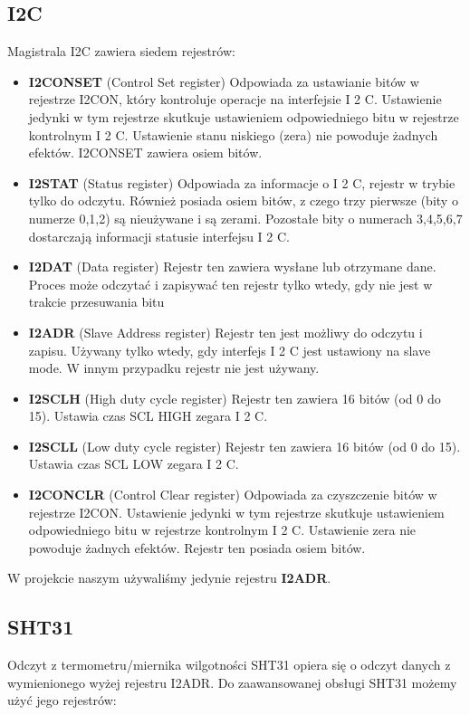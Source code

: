 \documentclass{classrep}
\begin{document}
\subsection {I2C}
Magistrala I2C zawiera siedem rejestrów:
\begin{itemize}
  \item \textbf{I2CONSET} (Control Set register) Odpowiada za ustawianie bitów w rejestrze I2CON, który
kontroluje operacje na interfejsie I 2 C. Ustawienie jedynki w tym rejestrze skutkuje
ustawieniem odpowiedniego bitu w rejestrze kontrolnym I 2 C. Ustawienie stanu niskiego
(zera) nie powoduje żadnych efektów. I2CONSET zawiera osiem bitów.
  \item \textbf{I2STAT} (Status register) Odpowiada za informacje o I 2 C, rejestr w trybie tylko do odczytu.
Również posiada osiem bitów, z czego trzy pierwsze (bity o numerze 0,1,2) są nieużywane i
są zerami. Pozostałe bity o numerach 3,4,5,6,7 dostarczają informacji statusie interfejsu I 2 C.
  \item \textbf{I2DAT} (Data register) Rejestr ten zawiera wysłane lub otrzymane dane. Proces może
odczytać i zapisywać ten rejestr tylko wtedy, gdy nie jest w trakcie przesuwania bitu
  \item \textbf{I2ADR} (Slave Address register) Rejestr ten jest możliwy do odczytu i zapisu. Używany tylko
wtedy, gdy interfejs I 2 C jest ustawiony na slave mode. W innym przypadku rejestr nie jest
używany.
  \item \textbf{I2SCLH} (High duty cycle register) Rejestr ten zawiera 16 bitów (od 0 do 15). Ustawia czas SCL
HIGH zegara I 2 C.
  \item \textbf{I2SCLL} (Low duty cycle register) Rejestr ten zawiera 16 bitów (od 0 do 15). Ustawia czas SCL
LOW zegara I 2 C.
  \item \textbf{I2CONCLR} (Control Clear register) Odpowiada za czyszczenie bitów w rejestrze I2CON.
Ustawienie jedynki w tym rejestrze skutkuje ustawieniem odpowiedniego bitu w rejestrze
kontrolnym I 2 C. Ustawienie zera nie powoduje żadnych efektów. Rejestr ten posiada osiem
bitów.\\
\end{itemize}
W projekcie naszym używaliśmy jedynie rejestru \textbf{I2ADR}.

\subsection {SHT31}
Odczyt z termometru/miernika wilgotności SHT31 opiera się o odczyt danych z wymienionego wyżej rejestru I2ADR. Do zaawansowanej obsługi SHT31 możemy użyć jego rejestrów:
\end{document}
